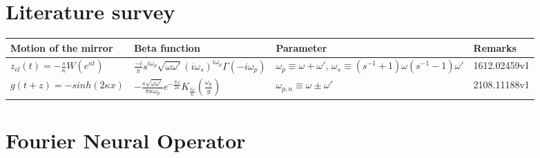 

\color{black}
\section{Literature survey}

\begin{center}
    \begin{tabular}{ | m{8em} | m{8em} | m{8em} | m{8em} | } 
  \hline
  Motion of the mirror & Beta function& Parameter & Remarks  \\ 
  \hline
   $z_{cl}(t) = -\frac{s}{\kappa}W(e^{\kappa t})$& $\frac{-i}{\pi}s^{i \omega_p}\sqrt{\omega\omega'}(i\omega_s)^{i\omega_p}\Gamma(-i\omega_p) $ & $\omega_p\equiv\omega+\omega'$, $\omega_s\equiv(s^{-1}+1)\omega(s^{-1}-1)\omega'$  & 1612.02459v1   \\ 
  \hline
  $g(t+z)=-sinh(2\kappa x)$ & $-\frac{s\sqrt{\omega\omega'}}{\pi \kappa \omega_p}e^{-\frac{\pi\omega}{2\kappa}}K_{\frac{i\omega}{\kappa}}(\frac{\omega_p}{g})$ & $\omega_{p,n}\equiv\omega\pm \omega'$ & 2108.11188v1\\ 
  \hline
\end{tabular}
\end{center}

\section{Fourier Neural Operator}

